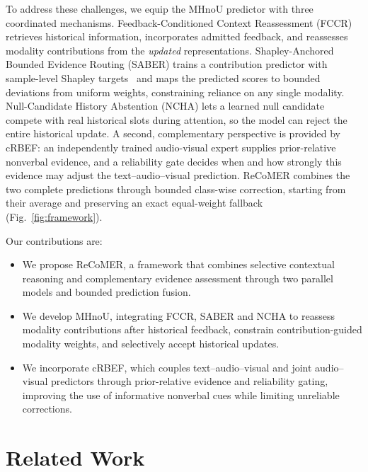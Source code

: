 \documentclass[10pt,twocolumn,letterpaper]{article}
\begin{document}
To address these challenges, we equip the MHnoU predictor with three coordinated mechanisms.
Feedback-Conditioned Context Reassessment (FCCR) retrieves historical information, incorporates admitted feedback, and reassesses modality contributions from the \emph{updated} representations.
Shapley-Anchored Bounded Evidence Routing (SABER) trains a contribution predictor with sample-level Shapley targets~\cite{shapley1953value} and maps the predicted scores to bounded deviations from uniform weights, constraining reliance on any single modality.
Null-Candidate History Abstention (NCHA) lets a learned null candidate compete with real historical slots during attention, so the model can reject the entire historical update.
A second, complementary perspective is provided by cRBEF: an independently trained audio-visual expert supplies prior-relative nonverbal evidence, and a reliability gate decides when and how strongly this evidence may adjust the text--audio--visual prediction.
ReCoMER combines the two complete predictions through bounded class-wise correction, starting from their average and preserving an exact equal-weight fallback (Fig.~\ref{fig:framework}).

Our contributions are:
\begin{itemize}
  \item We propose ReCoMER, a framework that combines selective contextual reasoning and complementary evidence assessment through two parallel models and bounded prediction fusion.
  \item We develop MHnoU, integrating FCCR, SABER and NCHA to reassess modality contributions after historical feedback, constrain contribution-guided modality weights, and selectively accept historical updates.
  \item We incorporate cRBEF, which couples text--audio--visual and joint audio--visual predictors through prior-relative evidence and reliability gating, improving the use of informative nonverbal cues while limiting unreliable corrections.
\end{itemize}

\section{Related Work}
\label{sec:related}
\end{document}
